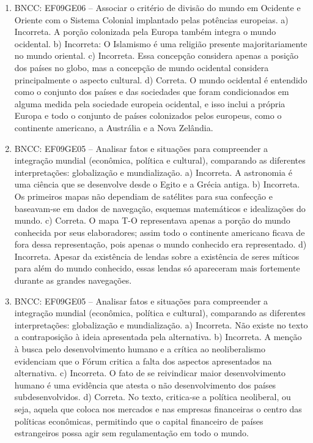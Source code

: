 \begin{enumerate}
\item
BNCC: EF09GE06 -- Associar o critério de divisão do mundo em Ocidente e
Oriente com o Sistema Colonial implantado pelas potências europeias.
a) Incorreta. A porção colonizada pela Europa também
  integra o mundo ocidental. b) Incorreta: O Islamismo é uma religião presente majoritariamente no
  mundo oriental. c) Incorreta. Essa concepção considera apenas a posição dos países no
  globo, mas a concepção de mundo ocidental considera principalmente o
  aspecto cultural. d) Correta. O mundo ocidental é entendido como o conjunto dos países e
  das sociedades que foram condicionados em alguma medida pela sociedade
  europeia ocidental, e isso inclui a própria Europa e todo o conjunto de
  países colonizados pelos europeus, como o continente americano, a
  Austrália e a Nova Zelândia.

\item
BNCC: EF09GE05 -- Analisar fatos e situações para compreender a
integração mundial (econômica, política e cultural), comparando as
diferentes interpretações: globalização e mundialização.
a) Incorreta. A astronomia é uma ciência que se desenvolve desde o Egito
  e a Grécia antiga. b) Incorreta. Os primeiros mapas não dependiam de satélites para sua
  confecção e baseavam-se em dados de navegação, esquemas matemáticos e
  idealizações do mundo. c) Correta. O mapa T-O representava apenas a porção do mundo conhecida
  por seus elaboradores; assim todo o continente americano ficava de
  fora dessa representação, pois apenas o mundo conhecido era
  representado. d) Incorreta. Apesar da existência de lendas sobre a existência de seres
  míticos para além do mundo conhecido, essas lendas só apareceram mais
  fortemente durante as grandes navegações.

\item
BNCC: EF09GE05 -- Analisar fatos e situações para compreender a
integração mundial (econômica, política e cultural), comparando as
diferentes interpretações: globalização e mundialização.
a) Incorreta. Não existe no texto a contraposição à ideia apresentada
  pela alternativa. b) Incorreta. A menção à busca pelo desenvolvimento
  humano e a crítica ao neoliberalismo evidenciam que o Fórum critica a
  falta dos aspectos apresentados na alternativa. c) Incorreta. O fato de se reivindicar maior desenvolvimento humano é uma
  evidência que atesta o não desenvolvimento dos países
  subdesenvolvidos. d) Correta. No texto, critica-se a política neoliberal, ou seja, aquela
  que coloca nos mercados e nas empresas financeiras o centro das políticas
  econômicas, permitindo que o capital financeiro de países estrangeiros
  possa agir sem regulamentação em todo o mundo.
\end{enumerate}

